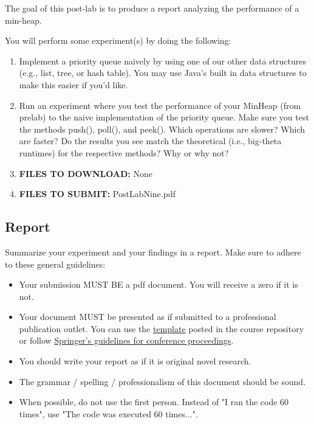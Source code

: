 \documentclass[paper=a4, fontsize=11pt, parskip=full]{scrartcl} %
\numberwithin{equation}{section} %
\numberwithin{figure}{section} %
\numberwithin{table}{section} %
\begin{document}
The goal of this post-lab is to produce a report analyzing the performance of a min-heap. 

You will perform some experiment(s) by doing the following:

\begin{enumerate}
	\item Implement a priority queue naively by using one of our other data structures (e.g., list, tree, or hash table). You may use Java's built in data structures to make this easier if you'd like.
	\item Run an experiment where you test the performance of your MinHeap (from prelab) to the naive implementation of the priority queue. Make sure you test the methods push(), poll(), and peek(). Which operations are slower? Which are faster? Do the results you see match the theoretical (i.e., big-theta runtimes) for the respective methods? Why or why not?
	\item \textbf{FILES TO DOWNLOAD:} None
	\item \textbf{FILES TO SUBMIT:} PostLabNine.pdf
\end{enumerate}

\subsection{Report}

Summarize your experiment and your findings in a report. Make sure to adhere to these general guidelines:

\begin{itemize}
	\item Your submission MUST BE a pdf document. You will receive a zero if it is not.
	\item Your document MUST be presented as if submitted to a professional publication outlet. You can use the \href{https://markfloryan.github.io/dsa1/labs/WordPaperTemplate.zip}{template} posted in the course repository or follow \href{https://www.springer.com/us/computer-science/lncs/conference-proceedings-guidelines}{Springer's guidelines for conference proceedings}.
	\item You should write your report as if it is original novel research.
	\item The grammar / spelling / professionalism of this document should be sound.
	\item When possible, do not use the first person. Instead of "I ran the code 60 times", use "The code was executed 60 times...".
\end{itemize}
\end{document}
